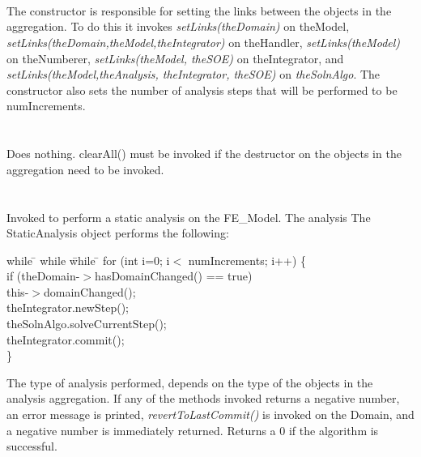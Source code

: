  \\
 \\ \\
The constructor is responsible for setting the links between the
objects in the aggregation. To do this it invokes {\em
setLinks(theDomain)} on \p theModel, {\em
setLinks(theDomain,theModel,theIntegrator)} on \p theHandler, 
{\em setLinks(theModel)} on \p theNumberer, {\em
setLinks(theModel, theSOE)} on \p theIntegrator, and  {\em
setLinks(theModel,theAnalysis, theIntegrator, theSOE)} on {\em
theSolnAlgo}.  The constructor also sets the number of analysis steps
that will be performed to be \p numIncrements.\\


 \\
\\ 
Does nothing. clearAll() must be invoked if the destructor on
the objects in the aggregation need to be invoked. \\

\\
 \\
Invoked to perform a static analysis on the FE\_Model. The analysis 
The StaticAnalysis object performs the following:
\begin{tabbing}
while \= \+ while \= while \= \kill
    for (int i=0; i$<$ numIncrements; i++) \{ \+ \\
    if (theDomain-$>$hasDomainChanged() == true) \+\\
	this-$>$domainChanged(); \- \\
    theIntegrator.newStep(); \\
    theSolnAlgo.solveCurrentStep(); \\
    theIntegrator.commit(); \- \\ \} \\
\end{tabbing}
\noindent The type of analysis performed, depends on the type of the
objects in the analysis aggregation. If any of the methods invoked
returns a negative number, an error message is printed, {\em
revertToLastCommit()} is invoked on the Domain, and a negative number
is immediately returned. Returns a $0$ if the algorithm is successful. \\

